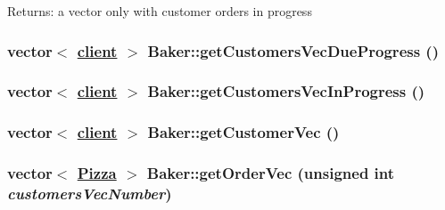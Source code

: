 \begin{Desc}
\item[Returns:]a vector only with customer orders in progress \end{Desc}
\hypertarget{class_baker_4c05936fa38e14b768511921a3288c57}{
\subsubsection[getCustomersVecDueProgress]{\setlength{\rightskip}{0pt plus 5cm}vector$<$ \hyperlink{classclient}{client} $>$ Baker::get\-Customers\-Vec\-Due\-Progress ()}}
\label{class_baker_4c05936fa38e14b768511921a3288c57}


\hypertarget{class_baker_8b798f098bfd9a23b11fa1d63d089609}{
\subsubsection[getCustomersVecInProgress]{\setlength{\rightskip}{0pt plus 5cm}vector$<$ \hyperlink{classclient}{client} $>$ Baker::get\-Customers\-Vec\-In\-Progress ()}}
\label{class_baker_8b798f098bfd9a23b11fa1d63d089609}


\hypertarget{class_baker_3970b0afe27b514282442b11592e1602}{
\subsubsection[getCustomerVec]{\setlength{\rightskip}{0pt plus 5cm}vector$<$ \hyperlink{classclient}{client} $>$ Baker::get\-Customer\-Vec ()}}
\label{class_baker_3970b0afe27b514282442b11592e1602}


\hypertarget{class_baker_ad0cbeddec394b25c5eade57247f4110}{
\subsubsection[getOrderVec]{\setlength{\rightskip}{0pt plus 5cm}vector$<$ \hyperlink{class_pizza}{Pizza} $>$ Baker::get\-Order\-Vec (unsigned int {\em customers\-Vec\-Number})}}
\label{class_baker_ad0cbeddec394b25c5eade57247f4110}


